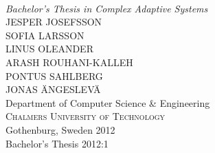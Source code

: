 \begin{titlepage}

\mbox{}
\vfill
\addtolength{\voffset}{2cm}
\begin{flushleft}
	{ \\[0.5cm]
	\emph{\Large Bachelor's Thesis in Complex Adaptive Systems} \\[.8cm]
	
	{\huge JESPER JOSEFSSON    }\\[.8cm]
	{\huge SOFIA LARSSON       }\\[.8cm]
	{\huge LINUS OLEANDER      }\\[.8cm]
	{\huge ARASH ROUHANI-KALLEH}\\[.8cm]
	{\huge PONTUS SAHLBERG     }\\[.8cm]
	{\huge JONAS ÄNGESLEVÄ     }\\[.8cm]
	
	{\Large Department of Computer Science \& Engineering \\
	\textsc{Chalmers University of Technology} \\
	Gothenburg, Sweden 2012 \\
	Bachelor's Thesis 2012:1\\
	} 
	}

\end{flushleft}

\end{titlepage}
\ClearShipoutPicture

\pagestyle{empty}
\newpage
\clearpage
\mbox{}
\newpage
\clearpage
\thispagestyle{empty}

\begin{abstract}
\end{abstract}

